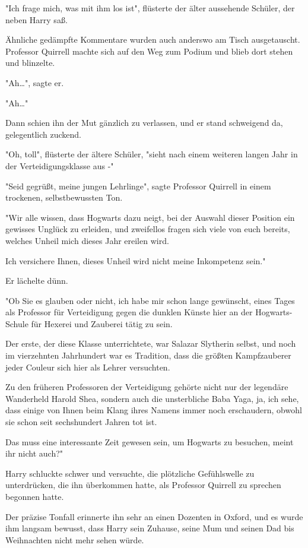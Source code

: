 {"Ich frage mich, was mit ihm los ist", flüsterte der älter aussehende Schüler, der neben Harry saß.

Ähnliche gedämpfte Kommentare wurden auch anderswo am Tisch ausgetauscht. Professor Quirrell machte sich auf den Weg zum Podium und blieb dort stehen und blinzelte.

"Ah…", sagte er.

"Ah…"

Dann schien ihn der Mut gänzlich zu verlassen, und er stand schweigend da, gelegentlich zuckend.

"Oh, toll", flüsterte der ältere Schüler, "sieht nach einem weiteren langen Jahr in der Verteidigungsklasse aus -"

"Seid gegrüßt, meine jungen Lehrlinge", sagte Professor Quirrell in einem trockenen, selbstbewussten Ton.

"Wir alle wissen, dass Hogwarts dazu neigt, bei der Auswahl dieser Position ein gewisses Unglück zu erleiden, und zweifellos fragen sich viele von euch bereits, welches Unheil mich dieses Jahr ereilen wird.

Ich versichere Ihnen, dieses Unheil wird nicht meine Inkompetenz sein."

Er lächelte dünn.

"Ob Sie es glauben oder nicht, ich habe mir schon lange gewünscht, eines Tages als Professor für Verteidigung gegen die dunklen Künste hier an der Hogwarts-Schule für Hexerei und Zauberei tätig zu sein.

Der erste, der diese Klasse unterrichtete, war Salazar Slytherin selbst, und noch im vierzehnten Jahrhundert war es Tradition, dass die größten Kampfzauberer jeder Couleur sich hier als Lehrer versuchten.

Zu den früheren Professoren der Verteidigung gehörte nicht nur der legendäre Wanderheld Harold Shea, sondern auch die unsterbliche Baba Yaga, ja, ich sehe, dass einige von Ihnen beim Klang ihres Namens immer noch erschaudern, obwohl sie schon seit sechshundert Jahren tot ist.

Das muss eine interessante Zeit gewesen sein, um Hogwarts zu besuchen, meint ihr nicht auch?"

Harry schluckte schwer und versuchte, die plötzliche Gefühlswelle zu unterdrücken, die ihn überkommen hatte, als Professor Quirrell zu sprechen begonnen hatte.

Der präzise Tonfall erinnerte ihn sehr an einen Dozenten in Oxford, und es wurde ihm langsam bewusst, dass Harry sein Zuhause, seine Mum und seinen Dad bis Weihnachten nicht mehr sehen würde.

}
